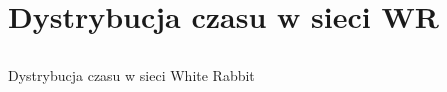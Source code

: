 \documentclass[compress,red]{beamer}
\begin{document}
\section{Dystrybucja czasu w sieci WR}
\subsection{}
\begin{frame}{Dystrybucja czasu w sieci White Rabbit}

 \begin{center}
    \color{blue!90}{Sub-nanosekundowa synchronizacja}
  \end{center}

\end{frame}
\end{document}
